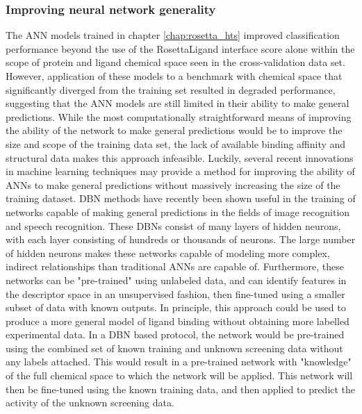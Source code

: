 \subsubsection{Improving neural network generality}
The ANN models trained in chapter \ref{chap:rosetta_hts} improved classification performance beyond the use of the RosettaLigand interface score alone within the scope of protein and ligand chemical space seen in the cross-validation data set.
However, application of these models to a benchmark with chemical space that significantly diverged from the training set resulted in degraded performance, suggesting that the \ac{ANN} models are still limited in their ability to make general predictions.
While the most computationally straightforward means of improving the ability of the network to make general predictions would be to improve the size and scope of the training data set, the lack of available binding affinity and structural data makes this approach infeasible. 
Luckily, several recent innovations in machine learning techniques may provide a method for improving the ability of \ac{ANN}s to make general predictions without massively increasing the size of the training dataset.
\ac{DBN} methods \citep{Hinton:2006dy} have recently been shown useful in the training of networks capable of making general predictions in the fields of image recognition\citep{Le:2013kz,Bengio:2009kb} and speech recognition\citep{Heigold:2013us}.
These \ac{DBN}s consist of many layers of hidden neurons, with each layer consisting of hundreds or thousands of neurons.
The large number of hidden neurons makes these networks capable of modeling more complex, indirect relationships than traditional \ac{ANN}s are capable of.
Furthermore, these networks can be "pre-trained" using unlabeled data, and can identify features in the descriptor space in an unsupervised fashion, then fine-tuned using a smaller subset of data with known outputs.
In principle, this approach could be used to produce a more general model of ligand binding without obtaining more labelled experimental data.
In a \ac{DBN} based protocol, the network would be pre-trained using the combined set of known training and unknown screening data without any labels attached.
This would result in a pre-trained network with "knowledge" of the full chemical space to which the network will be applied.
This network will then be fine-tuned using the known training data, and then applied to predict the activity of the unknown screening data.

